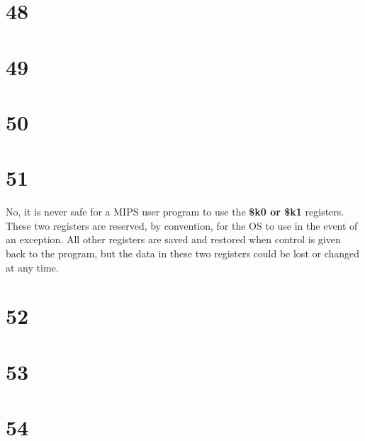 \documentclass[a4paper,11pt]{article}
\begin{document}

\section*{48}



\section*{49}


\section*{50}


\section*{51}
No, it is never safe for a MIPS user program to use the {\bf \$k0 or \$k1} registers.  These two registers are reserved, by convention, for the OS to use in the event of an exception.  All other registers are saved and restored when control is given back to the program, but the data in these two registers could be lost or changed at any time.


\section*{52}


\section*{53}


\section*{54}

\end{document}
